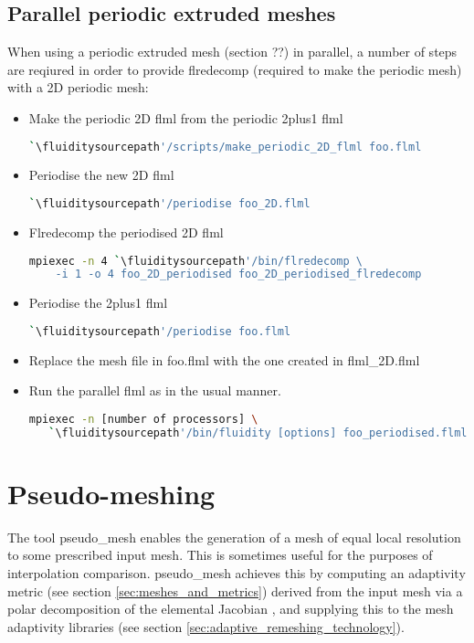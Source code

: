 \subsection{Parallel periodic extruded meshes}
When using a periodic extruded mesh (section ??) in parallel, a number
of steps are reqiured in order to provide flredecomp (required to make the
periodic mesh) with a 2D periodic mesh:

\begin{itemize}
\item Make the periodic 2D flml from the periodic 2plus1 flml
\begin{lstlisting}[language=bash]
 `\fluiditysourcepath'/scripts/make_periodic_2D_flml foo.flml
\end{lstlisting}
\item Periodise the new 2D flml
\begin{lstlisting}[language=bash]
 `\fluiditysourcepath'/periodise foo_2D.flml
\end{lstlisting}
\item Flredecomp the periodised 2D flml
\begin{lstlisting}[language=bash]
mpiexec -n 4 `\fluiditysourcepath'/bin/flredecomp \
    -i 1 -o 4 foo_2D_periodised foo_2D_periodised_flredecomp
\end{lstlisting}
\item Periodise the 2plus1 flml
\begin{lstlisting}[language=bash]
 `\fluiditysourcepath'/periodise foo.flml
\end{lstlisting}
\item Replace the mesh file in foo.flml with the one created in flml\_2D.flml
\item Run the parallel flml as in the usual manner.
\begin{lstlisting}[language=bash]
mpiexec -n [number of processors] \
   `\fluiditysourcepath'/bin/fluidity [options] foo_periodised.flml
\end{lstlisting}
\end{itemize}


\section{Pseudo-meshing}

The tool pseudo\_mesh enables the generation of a mesh of equal local resolution
to some prescribed input mesh. This is sometimes useful for the purposes of
interpolation comparison. pseudo\_mesh achieves this by computing an adaptivity
metric (see section \ref{sec:meshes_and_metrics}) derived from the input mesh
via a polar decomposition of the
elemental Jacobian \citep{micheletti2006}, and supplying this to the mesh adaptivity libraries
(see section \ref{sec:adaptive_remeshing_technology}).


